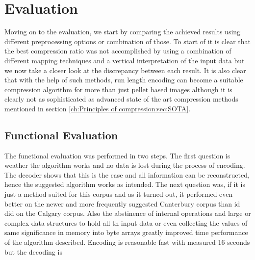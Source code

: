 
\chapter{Evaluation}
\label{ch:Evaluation}
Moving on to the evaluation, we start by comparing the achieved results using different preprocessing options or combination of those. To start of it is clear that the best compression ratio was not accomplished by using a combination of different mapping techniques and a vertical interpretation of the input data but we now take a closer look at the discrepancy between each result. It is also clear that with the help of such methods, run length encoding can become a suitable compression algorithm for more than just pellet based images although it is clearly not as sophisticated as advanced state of the art compression methods mentioned in section \ref{ch:Principles of compression:sec:SOTA}.

\section{Functional Evaluation}
\label{ch:Evaluation:sec:Functional Evaluation}
\par{
The functional evaluation was performed in two steps. The first question is weather the algorithm works and no data is lost during the process of encoding. The decoder shows that this is the case and all information can be reconstructed, hence the suggested algorithm works as intended. The next question was, if it is just a method suited for this corpus and as it turned out, it performed even better on the newer and more frequently suggested Canterbury corpus than id did on the Calgary corpus. Also the abstinence of internal operations and large or complex data structures to hold all th input data or even collecting the values of same significance in memory into byte arrays greatly improved time performance of the algorithm described. Encoding is reasonable fast with measured 16 seconds but the decoding is  
}

